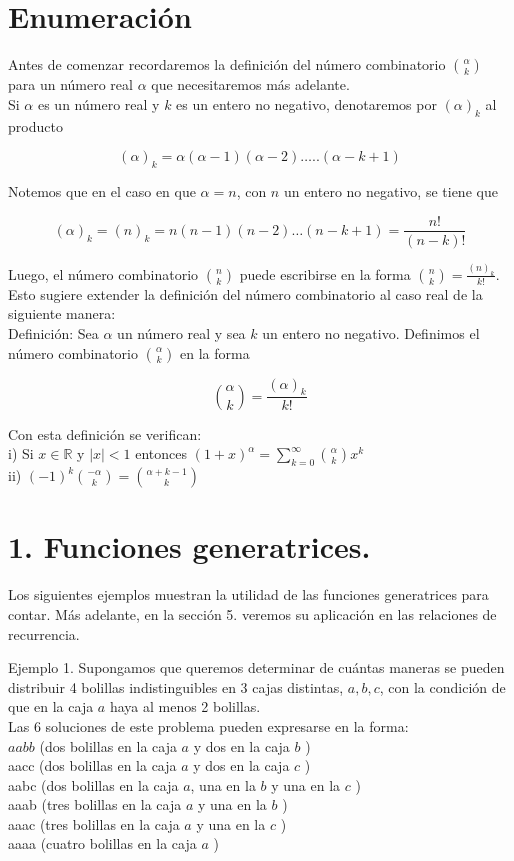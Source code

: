 \documentclass[10pt]{article}
\begin{document}
\section*{Enumeración}
Antes de comenzar recordaremos la definición del número combinatorio $\binom{\alpha}{k}$ para un número real $\alpha$ que necesitaremos más adelante.\\
Si $\alpha$ es un número real y $k$ es un entero no negativo, denotaremos por $(\alpha)_{k}$ al producto

$$
(\alpha)_{k}=\alpha(\alpha-1)(\alpha-2) \ldots . .(\alpha-k+1)
$$

Notemos que en el caso en que $\alpha=n$, con $n$ un entero no negativo, se tiene que

$$
(\alpha)_{k}=(n)_{k}=n(n-1)(n-2) \ldots(n-k+1)=\frac{n!}{(n-k)!}
$$

Luego, el número combinatorio $\binom{n}{k}$ puede escribirse en la forma $\binom{n}{k}=\frac{(n)_{k}}{k!}$. Esto sugiere extender la definición del número combinatorio al caso real de la siguiente manera:\\
Definición: Sea $\alpha$ un número real y sea $k$ un entero no negativo. Definimos el número combinatorio $\binom{\alpha}{k}$ en la forma

$$
\binom{\alpha}{k}=\frac{(\alpha)_{k}}{k!}
$$

Con esta definición se verifican:\\
i) Si $x \in \mathbb{R}$ y $|x|<1$ entonces $(1+x)^{\alpha}=\sum_{k=0}^{\infty}\binom{\alpha}{k} x^{k}$\\
ii) $(-1)^{k}\binom{-\alpha}{k}=\binom{\alpha+k-1}{k}$

\section*{1. Funciones generatrices.}
Los siguientes ejemplos muestran la utilidad de las funciones generatrices para contar. Más adelante, en la sección 5. veremos su aplicación en las relaciones de recurrencia.

Ejemplo 1. Supongamos que queremos determinar de cuántas maneras se pueden distribuir 4 bolillas indistinguibles en 3 cajas distintas, $a, b, c$, con la condición de que en la caja $a$ haya al menos 2 bolillas.\\
Las 6 soluciones de este problema pueden expresarse en la forma:\\
$a a b b$ (dos bolillas en la caja $a$ y dos en la caja $b$ )\\
aacc (dos bolillas en la caja $a$ y dos en la caja $c$ )\\
aabc (dos bolillas en la caja $a$, una en la $b$ y una en la $c$ )\\
aaab (tres bolillas en la caja $a$ y una en la $b$ )\\
aaac (tres bolillas en la caja $a$ y una en la $c$ )\\
aaaa (cuatro bolillas en la caja $a$ )
\end{document}
